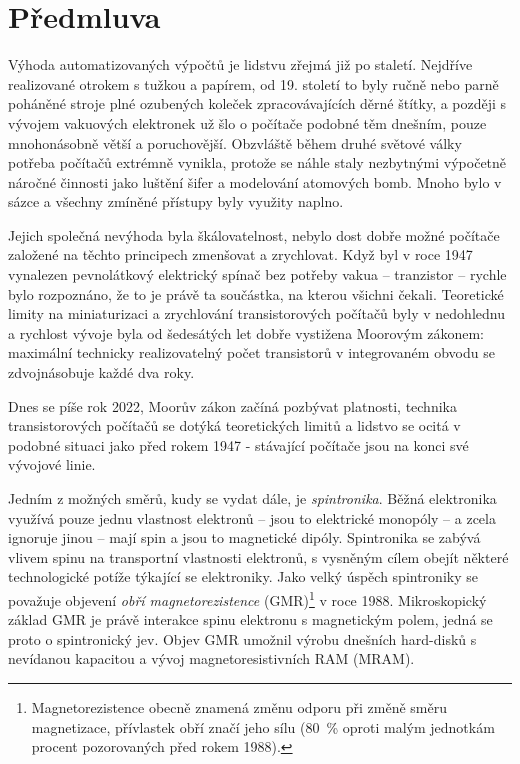 \chapter*{Předmluva}
Výhoda automatizovaných výpočtů je lidstvu zřejmá již po staletí.
Nej\-dří\-ve realizované otrokem s tužkou a papírem, od 19. století to byly ručně nebo parně poháněné stroje plné ozubených koleček zpracovávajících děrné štítky, a později s vývojem vakuových elektronek už šlo o počítače podobné těm dnešním, pouze mnohonásobně větší a poruchovější.
Obzvláště během druhé světové války potřeba počítačů extrémně vynikla, protože se náhle staly nezbytnými výpočetně náročné činnosti jako luštění šifer a modelování atomových bomb.
Mnoho bylo v sázce a všechny zmíněné přístupy byly využity naplno.

Jejich společná nevýhoda byla škálovatelnost, nebylo dost dobře možné počítače založené na těchto principech zmenšovat a zrychlovat.
Když byl v roce 1947 vynalezen pevnolátkový elektrický spínač bez potřeby vakua -- tranzistor -- rychle bylo rozpoznáno, že to je právě ta součástka, na kterou všichni čekali.
Teoretické limity na miniaturizaci a zrychlování transistorových počítačů byly v nedohlednu a rychlost vývoje byla od šedesátých let dobře vystižena Moorovým zákonem: maximální technicky realizovatelný počet transistorů v integrovaném obvodu se zdvojnásobuje každé dva roky.

Dnes se píše rok 2022, Moorův zákon začíná pozbývat platnosti, technika transistorových počítačů se dotýká teoretických limitů a lidstvo se ocitá v podobné situaci jako před rokem 1947 - stávající počítače jsou na konci své vývojové linie.

Jedním z možných směrů, kudy se vydat dále, je \emph{spintronika}.
Běžná elektronika využívá pouze jednu vlastnost elektronů -- jsou to elektrické monopóly -- a zcela ignoruje jinou -- mají spin a jsou to magnetické dipóly.
Spintronika se zabývá vlivem spinu na transportní vlastnosti elektronů, s vysněným cílem obejít některé technologické potíže týkající se elektroniky.
Jako velký úspěch spintroniky se považuje objevení \emph{obří magnetorezistence} (GMR)\footnote{Magnetorezistence obecně znamená změnu odporu při změně směru magnetizace, přívlastek obří značí jeho sílu (\SI{80}{\percent} oproti malým jednotkám procent pozorovaných před rokem 1988).} v roce 1988.
Mikroskopický základ GMR je právě interakce spinu elektronu s magnetickým polem, jedná se proto o spintronický jev.
Objev GMR umožnil výrobu dnešních hard-disků s nevídanou kapacitou a vývoj magnetoresistivních RAM (MRAM).

